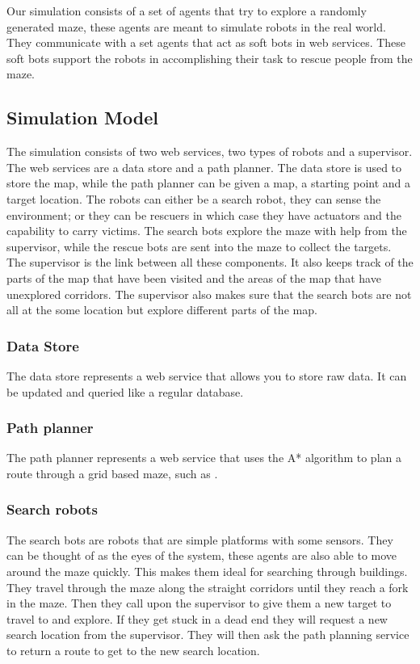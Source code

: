 Our simulation consists of a set of agents that try to explore a randomly
generated maze, these agents are meant to simulate robots in the real world.
They communicate with a set agents that act as soft bots in web services. These
soft bots support the robots in accomplishing their task to rescue people from
the maze.

\subsection{Simulation Model}
The simulation consists of two web services, two types of robots and a
supervisor. The web services are a data store and a path planner. The data
store is used to store the map, while the path planner can be given a map, a
starting point and a target location. The robots can either be a search robot,
they can sense the environment; or they can be rescuers in which case they have
actuators and the capability to carry victims. The search bots explore the maze
with help from the supervisor, while the rescue bots are sent into the maze to
collect the targets. The supervisor is the link between all these components.
It also keeps track of the parts of the map that have been visited and the
areas of the map that have unexplored corridors. The supervisor also makes sure
that the search bots are not all at the some location but explore different
parts of the map.

\subsubsection{Data Store}
The data store represents a web service that allows you to store raw data. It
can be updated and queried like a regular database.

\subsubsection{Path planner}
The path planner represents a web service that uses the A* algorithm
\cite{astar} to plan a route through a grid based maze, such as
\cite{astarweb}.

\subsubsection{Search robots}
The search bots are robots that are simple platforms with some sensors. They
can be thought of as the eyes of the system, these agents are also able to move
around the maze quickly. This makes them ideal for searching through buildings.
They travel through the maze along the straight corridors until they reach a
fork in the maze. Then they call upon the supervisor to give them a new target
to travel to and explore. If they get stuck in a dead end they will request a
new search location from the supervisor. They will then ask the path planning
service to return a route to get to the new search location.

